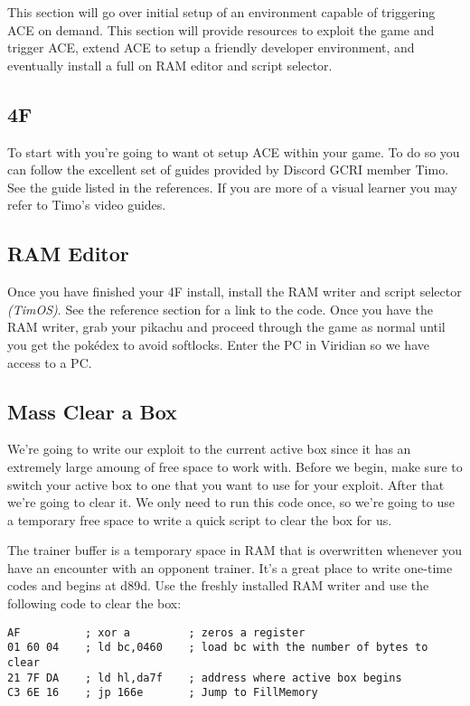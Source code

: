 \documentclass[../main.tex]{subfiles}
\begin{document}
    This section will go over initial setup of an environment capable of triggering ACE on demand.  This section will provide resources to exploit the game and trigger ACE, extend ACE to setup a friendly developer environment, and eventually install a full on RAM editor and script selector.

    \subsection{4F}
    To start with you're going to want ot setup ACE within your game.  To do so you can follow the excellent set of guides provided by Discord GCRI member Timo.  See the guide listed in the references\cite{gen1setup}.  If you are more of a visual learner you may refer to Timo's video guides\cite{gen1videosetup}.

    \subsection{RAM Editor}
    Once you have finished your 4F install, install the RAM writer and script selector \textit{(TimOS)}.  See the reference section for a link to the code\cite{timos}.  Once you have the RAM writer, grab your pikachu and proceed through the game as normal until you get the pokédex to avoid softlocks.  Enter the PC in Viridian so we have access to a PC.

    \subsection{Mass Clear a Box}
    We're going to write our exploit to the current active box since it has an extremely large amoung of free space to work with.  Before we begin, make sure to switch your active box to one that you want to use for your exploit.  After that we're going to clear it.  We only need to run this code once, so we're going to use a temporary free space to write a quick script to clear the box for us.

    The trainer buffer is a temporary space in RAM that is overwritten whenever you have an encounter with an opponent trainer.  It's a great place to write one-time codes and begins at d89d.  Use the freshly installed RAM writer and use the following code to clear the box:

    \begin{verbatim}
AF          ; xor a         ; zeros a register
01 60 04    ; ld bc,0460    ; load bc with the number of bytes to clear
21 7F DA    ; ld hl,da7f    ; address where active box begins
C3 6E 16    ; jp 166e       ; Jump to FillMemory
    \end{verbatim}
\end{document}

